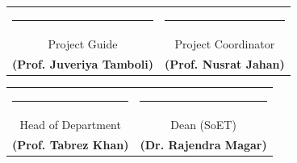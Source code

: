 \begin{tabular}{cc}
\hspace{0.25in}\noindent\rule{4cm}{0.5pt} & \hspace{1.6in}\noindent\rule{4cm}{0.5pt} \\
\hspace{0.25in} \small{Project Guide} & \hspace{1.6in}\small{Project Coordinator} \\ 
\hspace{0.25in} \small{\textbf{(Prof. Juveriya Tamboli)}} & \hspace{1.6in}\small{\textbf{(Prof. Nusrat Jahan)}}\\
\end{tabular}

\vspace{0.15in}
		
\begin{tabular}{cc}
\hspace{0.35in}\noindent\rule{4cm}{0.5pt} & \hspace{1.6in}\noindent\rule{4cm}{0.5pt} \\
\hspace{0.35in} \small{Head of Department} & \hspace{1.6in}\small{Dean (SoET)}\\
\hspace{0.35in} \small{\textbf{(Prof. Tabrez Khan)}} & \hspace{1.6in}\small{\textbf{(Dr. Rajendra Magar)}}\\
\end{tabular}
